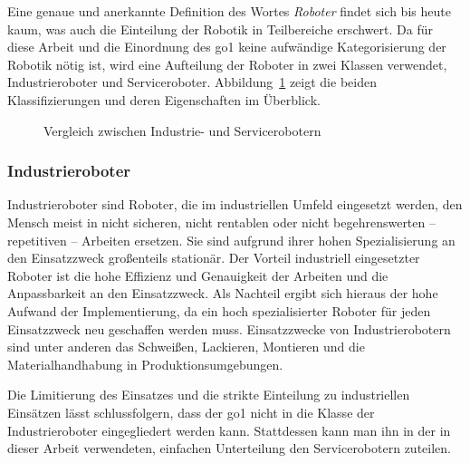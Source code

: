 Eine genaue und anerkannte Definition des Wortes \emph{Roboter} findet sich bis heute kaum, was auch die Einteilung der Robotik
in Teilbereiche erschwert.
Da für diese Arbeit und die Einordnung des \gls{go1} keine aufwändige Kategorisierung der Robotik nötig ist,
wird eine Aufteilung der Roboter in zwei Klassen verwendet, Industrieroboter und Serviceroboter.
Abbildung~\ref{fig:industrie_vs_service} zeigt die beiden Klassifizierungen und deren Eigenschaften im Überblick.

\begin{figure}[h]
    \caption[Vergleich zwischen Industrie- und Servicerobotern]{Vergleich zwischen Industrie- und Servicerobotern\footnotemark}\label{fig:industrie_vs_service}
\end{figure}

\subsubsection{Industrieroboter}

Industrieroboter sind Roboter, die im industriellen Umfeld eingesetzt werden, den Mensch meist in nicht sicheren,
nicht rentablen oder nicht begehrenswerten -- repetitiven -- Arbeiten ersetzen.
Sie sind aufgrund ihrer hohen Spezialisierung an den Einsatzzweck großenteils stationär.
Der Vorteil industriell eingesetzter Roboter ist die hohe Effizienz und Genauigkeit der Arbeiten und die Anpassbarkeit an
den Einsatzzweck.
Als Nachteil ergibt sich hieraus der hohe Aufwand der Implementierung, da ein hoch spezialisierter Roboter für jeden
Einsatzzweck neu geschaffen werden muss.
Einsatzzwecke von Industrierobotern sind unter anderen das Schweißen, Lackieren, Montieren und die Materialhandhabung in
Produktionsumgebungen.

Die Limitierung des Einsatzes und die strikte Einteilung zu industriellen Einsätzen lässt schlussfolgern, dass der \gls{go1}
nicht in die Klasse der Industrieroboter eingegliedert werden kann.
Stattdessen kann man ihn in der in dieser Arbeit verwendeten, einfachen Unterteilung den Servicerobotern zuteilen.

